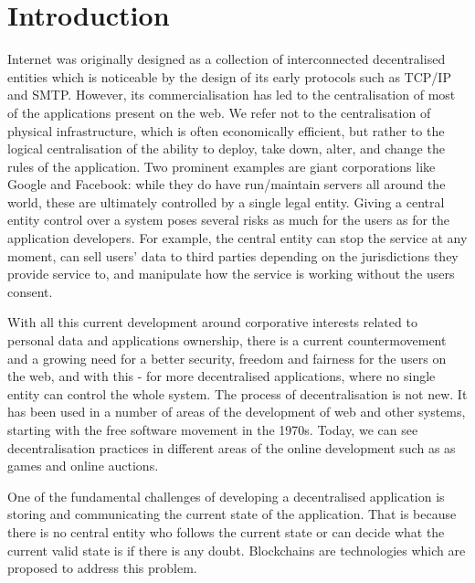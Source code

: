 \section{Introduction}\label{sec:intro}
Internet was originally designed as a collection of interconnected decentralised entities which is noticeable by the design of its early protocols such as TCP/IP and SMTP. However, its commercialisation has led to the centralisation of most of the applications present on the web. We refer not to the centralisation of physical infrastructure, which is often economically efficient, but rather to the logical centralisation of the ability to deploy, take down, alter, and change the rules of the application. Two prominent examples are giant corporations like Google and Facebook: while they do have run/maintain servers all around the world, these are ultimately controlled by a single legal entity. Giving a central entity control over a system poses several risks as much for the users as for the application developers. For example, the central entity can stop the service at any moment, can sell users' data to third parties depending on the jurisdictions they provide service to, and manipulate how the service is working without the users consent.

With all this current development around corporative interests related to personal data and applications ownership, there is a current countermovement and a growing need for a better security, freedom and fairness for the users on the web, and with this - for more decentralised applications, where no single entity can control the whole system. The process of decentralisation is not new. It has been used in a number of areas of the development of web and other systems, starting with the free software movement in the 1970s. Today, we can see decentralisation practices in different areas of the online development such as as games \cite{} and online auctions\cite{}.

One of the fundamental challenges of developing a decentralised application is storing and communicating the current state of the application. That is because there is no central entity who follows the current state or can decide what the current valid state is if there is any doubt. Blockchains are technologies which are proposed to address this problem.


